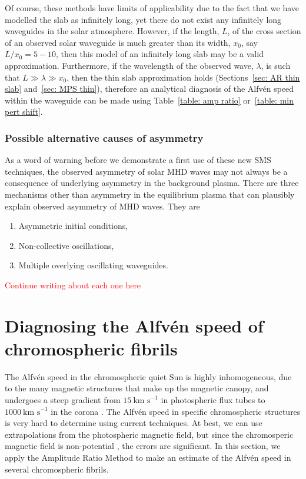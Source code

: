 \documentclass[12pt]{../style-files/ociamthesis}
\begin{document}
Of course, these methods have limits of applicability due to the fact that we have modelled the slab as infinitely long, yet there do not exist any infinitely long waveguides in the solar atmosphere. However, if the length, $L$, of the cross section of an observed solar waveguide is much greater than its width, $x_0$, say $L/x_0 = 5-10$, then this model of an infinitely long slab may be a valid approximation. Furthermore, if the wavelength of the observed wave, $\lambda$, is such that $L \gg \lambda \gg x_0$, then the thin slab approximation holds (Sections~\ref{sec: AR thin slab} and~\ref{sec: MPS thin}), therefore an analytical diagnosis of the Alfv\'{e}n speed within the waveguide can be made using Table~\ref{table: amp ratio} or~\ref{table: min pert shift}.


\subsubsection{Possible alternative causes of asymmetry}

As a word of warning before we demonstrate a first use of these new SMS techniques, the observed asymmetry of solar MHD waves may not always be a consequence of underlying asymmetry in the background plasma. There are three mechanisms other than asymmetry in the equilibrium plasma that can plausibly explain observed asymmetry of MHD waves. They are
\begin{enumerate}
	\item Asymmetric initial conditions,
	\item Non-collective oscillations,
	\item Multiple overlying oscillating waveguides.
\end{enumerate}
\textcolor{red}{Continue writing about each one here}


\section{Diagnosing the Alfv\'{e}n speed of chromospheric fibrils}
\label{sec: fibrils}

The Alfv\'{e}n speed in the chromospheric quiet Sun is highly inhomogeneous, due to the many magnetic structures that make up the magnetic canopy, and undergoes a steep gradient from $15~\text{km~s}^{-1}$ in photospheric flux tubes to $1000~\text{km~s}^{-1}$ in the corona \citep{van_etal11}. The Alfv\'{e}n speed in specific chromospheric structures is very hard to determine using current techniques. At best, we can use extrapolations from the photospheric magnetic field, but since the chromosperic magnetic field is non-potential \citep{woo_etal99,wie_etal14}, the errors are significant.
In this section, we apply the Amplitude Ratio Method to make an estimate of the Alfv\'{e}n speed in several chromospheric fibrils.
\end{document}
